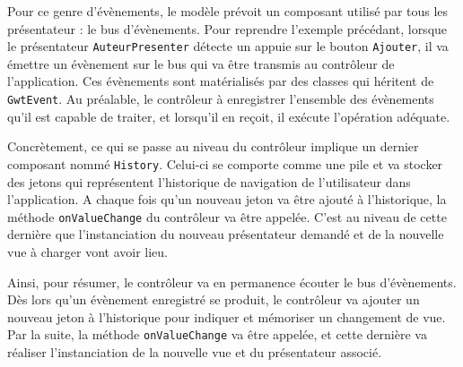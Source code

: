 Pour ce genre d'évènements, le modèle prévoit un composant utilisé par tous les présentateur : le bus d'évènements. Pour reprendre l'exemple précédant, lorsque le présentateur \verb|AuteurPresenter| détecte un appuie sur le bouton \verb|Ajouter|, il va émettre un évènement sur le bus qui va être transmis au contrôleur de l'application. Ces évènements sont matérialisés par des classes qui héritent de \verb|GwtEvent|. Au préalable, le contrôleur à enregistrer l'ensemble des évènements qu'il est capable de traiter, et lorsqu'il en reçoit, il exécute l'opération adéquate.

Concrètement, ce qui se passe au niveau du contrôleur implique un dernier composant nommé \verb|History|. Celui-ci se comporte comme une pile et va stocker des jetons qui représentent l'historique de navigation de l'utilisateur dans l'application. A chaque fois qu'un nouveau jeton va être ajouté à l'historique, la méthode \verb|onValueChange| du contrôleur va être appelée. C'est au niveau de cette dernière que l'instanciation du nouveau présentateur demandé et de la nouvelle vue à charger vont avoir lieu.  

Ainsi, pour résumer, le contrôleur va en permanence écouter le bus d'évènements. Dès lors qu'un évènement enregistré se produit, le contrôleur va ajouter un nouveau jeton à l'historique pour indiquer et mémoriser un changement de vue. Par la suite, la méthode \verb|onValueChange| va être appelée, et cette dernière va réaliser l'instanciation de la nouvelle vue et du présentateur associé.